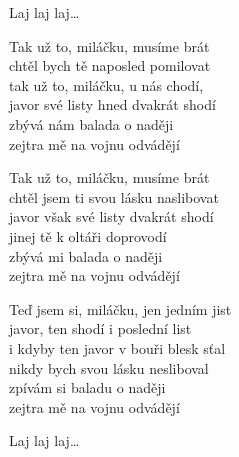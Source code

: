 
\re{}
Laj laj laj\ldots{}

\ve{}
Tak už to, miláčku, musíme brát \\
chtěl bych tě naposled pomilovat\\
tak už to, miláčku, u nás chodí, \\
javor své listy hned dvakrát shodí \\ 
zbývá nám balada o naději\\ 
zejtra mě na vojnu odvádějí 

\ve{}
Tak už to, miláčku, musíme brát\\
chtěl jsem ti svou lásku naslibovat\\
javor však své listy dvakrát shodí\\
jinej tě k oltáři doprovodí\\
zbývá mi balada o naději\\
zejtra mě na vojnu odvádějí

\ve{}
Teď jsem si, miláčku, jen jedním jist\\
javor, ten shodí i poslední list\\
i kdyby ten javor v bouři blesk sťal\\
nikdy bych svou lásku nesliboval\\
zpívám si baladu o naději\\
zejtra mě na vojnu odvádějí 
 
\re{}
Laj laj laj\ldots{}

\esong